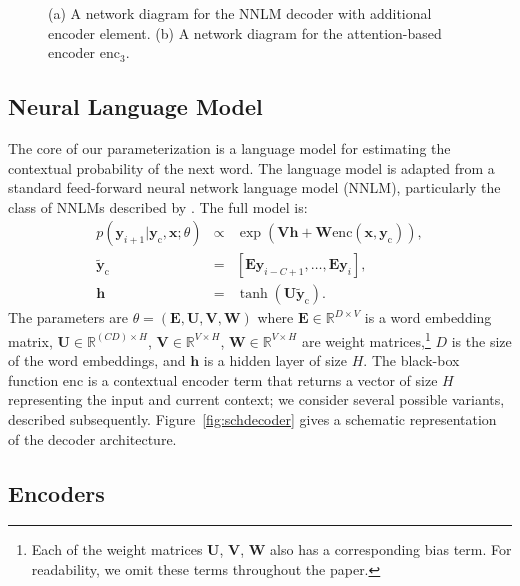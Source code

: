 \documentclass[11pt,a4paper]{article}
\newcommand{\enc}{\mathrm{enc}}
\newcommand{\xvec}{\mathbf{x}}
\newcommand{\yvec}{\mathbf{y}}
\newcommand{\context}{\mathbf{y}_{\mathrm{c}}}
\newcommand{\embcontext}{\mathbf{\tilde{y}}_{\mathrm{c}}}
\newcommand{\Uvec}{\mathbf{U}}
\newcommand{\Evec}{\mathbf{E}}
\newcommand{\Vvec}{\mathbf{V}}
\newcommand{\Wvec}{\mathbf{W}}
\newcommand{\hvec}{\mathbf{h}}
\newcommand{\reals}{\mathbb{R}}
\begin{document}
\begin{figure}
\begin{subfigure}{0.3\columnwidth}
  \caption{\label{fig:schencoder}}
  \end{subfigure}

  \caption{\small \label{fig:decoder} (a) A network diagram for the NNLM decoder with additional encoder element. (b)
    A network diagram for the attention-based encoder $\mathrm{enc}_3$.  
  }
\end{figure}


\subsection{Neural Language Model}

The core of our parameterization is a language model for estimating
the contextual probability of the next word. The language model is
adapted from a standard feed-forward neural network language model
(NNLM), particularly the class of NNLMs described by
. The full model is:
\begin{eqnarray*}
 p(\yvec_{i+1} | \context, \xvec; \theta) &\propto& \exp(\Vvec \hvec + \Wvec \enc(\xvec, \context)), \\  
  \embcontext &=& [\Evec \yvec_{i-C + 1}, \dots,\Evec \yvec_{i}],  \\ 
 \hvec &=& \tanh(\Uvec  \embcontext ).  
\end{eqnarray*}
\noindent The parameters are $\theta = (\Evec, \Uvec , \Vvec,
\Wvec)$ where $\Evec \in \reals^{D \times V}$ is a word embedding
matrix, $\Uvec \in \reals^{(C D) \times H} $, $\Vvec \in \reals^{V
  \times H}$, $\Wvec \in \reals^{V \times H}$ are weight
matrices,\footnote{Each of the weight matrices $\Uvec$, $\Vvec$,
  $\Wvec$ also has a corresponding bias term. For readability, we
  omit these terms throughout the paper.} $D$ is the size of the word
embeddings, and $\hvec$ is a hidden layer of size $H$. The black-box function $\enc$
is a contextual encoder term that returns a vector of size $H$
representing the input and current context; we consider several
possible variants, described subsequently. Figure~\ref{fig:schdecoder}
gives a schematic representation of the decoder
architecture.


\subsection{Encoders}
\end{document}
